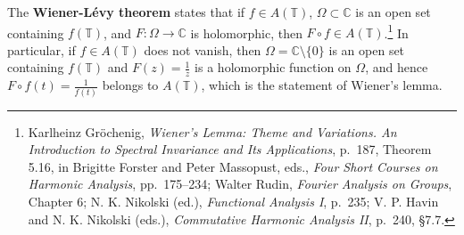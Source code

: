 \documentclass{article}
\theoremstyle{definition}
\begin{document}
The \textbf{Wiener-L\'evy theorem} states that if $f \in A(\mathbb{T})$,
$\Omega \subset \mathbb{C}$ is an open set containing $f(\mathbb{T})$, and $F:\Omega \to \mathbb{C}$
is holomorphic, then $F \circ f \in A(\mathbb{T})$.\footnote{Karlheinz Gr\"ochenig,
{\em Wiener's Lemma: Theme and Variations. An Introduction to
Spectral Invariance and Its Applications}, p.~187, Theorem 5.16, in Brigitte Forster and Peter Massopust, eds., {\em Four Short Courses on Harmonic Analysis}, pp.~175--234;
Walter Rudin, {\em Fourier Analysis on Groups}, Chapter 6; N. K. Nikolski (ed.), {\em Functional Analysis I}, p.~235;
V. P. Havin and N. K. Nikolski (eds.), {\em Commutative Harmonic Analysis II}, p.~240, \S 7.7.}
In particular, if $f \in A(\mathbb{T})$ does not vanish, then $\Omega=\mathbb{C} \setminus \{0\}$ is an open set
containing $f(\mathbb{T})$ and $F(z)=\frac{1}{z}$ is a holomorphic function on $\Omega$, and hence
$F \circ f(t)=\frac{1}{f(t)}$ belongs to $A(\mathbb{T})$, which is the statement of Wiener's lemma.
\end{document}
